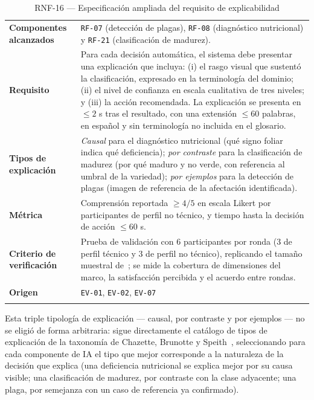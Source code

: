 \documentclass[11pt,a4paper]{article}
\newcommand{\id}[1]{\texttt{#1}}
\begin{document}
\begin{longtable}{|L{3.2cm}|L{10.8cm}|}
\hline
{}\\
\hline
\endhead
\textbf{Componentes alcanzados} & \id{RF-07} (detección de plagas), \id{RF-08} (diagnóstico
nutricional) y \id{RF-21} (clasificación de madurez). \\ \hline
\textbf{Requisito} & Para cada decisión automática, el sistema debe presentar una explicación que
incluya: (i) el rasgo visual que sustentó la clasificación, expresado en la terminología del
dominio; (ii) el nivel de confianza en escala cualitativa de tres niveles; y (iii) la acción
recomendada. La explicación se presenta en $\leq 2$ s tras el resultado, con una extensión
$\leq 60$ palabras, en español y sin terminología no incluida en el glosario. \\ \hline
\textbf{Tipos de explicación} & \emph{Causal} para el diagnóstico nutricional (qué signo foliar
indica qué deficiencia); \emph{por contraste} para la clasificación de madurez (por qué maduro y no
verde, con referencia al umbral de la variedad); \emph{por ejemplos} para la detección de plagas
(imagen de referencia de la afectación identificada). \\ \hline
\textbf{Métrica} & Comprensión reportada $\geq 4/5$ en escala Likert por participantes de perfil no
técnico, y tiempo hasta la decisión de acción $\leq 60$ s. \\ \hline
\textbf{Criterio de verificación} & Prueba de validación con 6 participantes por ronda (3 de perfil
técnico y 3 de perfil no técnico), replicando el tamaño muestral de~\cite{chazette2022}; se mide la
cobertura de dimensiones del marco, la satisfacción percibida y el acuerdo entre rondas. \\ \hline
\textbf{Origen} & \id{EV-01}, \id{EV-02}, \id{EV-07} \\ \hline
\caption{RNF-16 --- Especificación ampliada del requisito de explicabilidad}
\end{longtable}

Esta triple tipología de explicación --- causal, por contraste y por ejemplos --- no se eligió de
forma arbitraria: sigue directamente el catálogo de tipos de explicación de la taxonomía de
Chazette, Brunotte y Speith~\cite{chazette2021}, seleccionando para cada componente de IA el tipo
que mejor corresponde a la naturaleza de la decisión que explica (una deficiencia nutricional se
explica mejor por su causa visible; una clasificación de madurez, por contraste con la clase
adyacente; una plaga, por semejanza con un caso de referencia ya confirmado).
\end{document}
